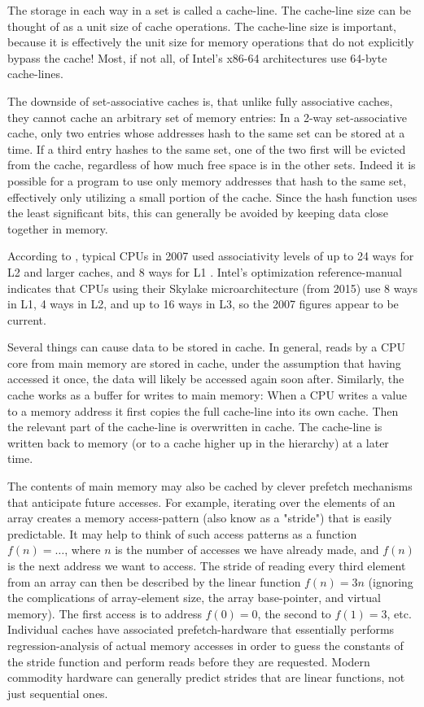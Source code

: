 The storage in each way in a set is called a cache-line. The cache-line
size can be thought of as a unit size of cache operations. The cache-line size
is important, because it is effectively the unit size for memory operations that
do not explicitly bypass the cache! Most, if not all, of
Intel's x86-64 architectures use 64-byte cache-lines\cite{inteloptimize}.

The downside of set-associative caches is, that unlike fully associative
caches, they cannot cache an arbitrary set of memory entries: In a 2-way
set-associative cache, only two entries whose addresses hash to the same set can
be stored at a time. If a third entry hashes to the same set, one of the two
first will be evicted from the cache, regardless of how much free space is in
the other sets. Indeed it is possible for a program to use only memory
addresses that hash to the same set, effectively only utilizing a small portion
of the cache. Since the hash function uses the least significant bits, this can
generally be avoided by keeping data close together in memory. 

According to \citeauthor{whatprogrammersshouldknow}, typical
CPUs in 2007 used associativity levels of up to 24 ways for L2 and larger
caches, and 8 ways for L1 \cite{whatprogrammersshouldknow}. Intel's
optimization reference-manual \cite{inteloptimize} indicates that CPUs using their
Skylake microarchitecture (from 2015) use 8 ways in L1, 4 ways in L2, and up to
16 ways in L3, so the 2007 figures appear to be current.

Several things can cause data to be stored in cache. In general, reads by
a CPU core from main memory are stored in cache, under the
assumption that having accessed it once, the data will likely be accessed again
soon after. Similarly, the cache works as a buffer for writes to main memory:
When a CPU writes a value to a memory address it first copies the full
cache-line into its own cache. Then the relevant part of the cache-line is
overwritten in cache. The cache-line is written back to memory (or to a
cache higher up in the hierarchy) at a later time.

The contents of main memory may also be cached by clever prefetch mechanisms that
anticipate future accesses. For example, iterating over the elements of an array
creates a memory access-pattern (also know as a "stride") that is easily
predictable. It may help to think of such access patterns as a function $f(n) =
\ldots$, where $n$ is the number of accesses we have already made, and $f(n)$ is
the next address we want to access. The stride of reading every third element
from an array can then be described by the linear function $f(n) = 3n$ (ignoring
the complications of array-element size, the array base-pointer, and virtual
memory).
The first access is to address $f(0) = 0$, the second to $f(1) = 3$, etc.
Individual caches have associated prefetch-hardware that essentially performs
regression-analysis of actual memory accesses in order to guess the constants of
the stride function and perform reads before they are requested. Modern
commodity hardware can generally predict strides that are linear functions, not
just sequential ones.

